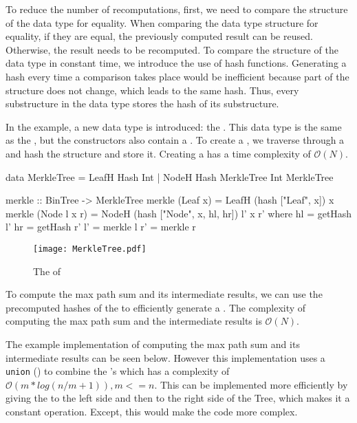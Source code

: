 To reduce the number of recomputations, first, we need to compare the structure of the data type for equality. When comparing the data type structure for equality, if they are equal, the previously computed result can be reused. Otherwise, the result needs to be recomputed. To compare the structure of the data type in constant time, we introduce the use of hash functions. Generating a hash every time a comparison takes place would be inefficient because part of the structure does not change, which leads to the same hash. Thus, every substructure in the data type stores the hash of its substructure. 

In the example, a new data type is introduced: the . This data type is the same as the , but the constructors also contain a . To create a , we traverse through a  and hash the structure and store it. Creating a  has a time complexity of $\mathcal{O}(N)$.

\begin{haskell}
data MerkleTree = LeafH Hash Int
                | NodeH Hash MerkleTree Int MerkleTree

merkle :: BinTree -> MerkleTree
merkle (Leaf x)     = LeafH (hash ["Leaf", x]) x
merkle (Node l x r) = NodeH (hash ["Node", x, hl, hr]) l' x r'
  where
    hl = getHash l'
    hr = getHash r'
    l' = merkle l
    r' = merkle r
\end{haskell}

\begin{figure}[H]
    \centering
    \texttt{[image: MerkleTree.pdf]}
    \caption{The  of }
\end{figure}

To compute the max path sum and its intermediate results, we can use the precomputed hashes of the  to efficiently generate a . The complexity of computing the max path sum and the intermediate results is $\mathcal{O}(N)$.   

The example implementation of computing the max path sum and its intermediate results can be seen below. However this implementation uses a \texttt{union} (\inlinehaskell{<>}) to combine the 's which has a complexity of $\mathcal{O}(m*log(n/m + 1)), m <= n$\cite{HaskellDataUnion}. This can be implemented more efficiently by giving the  to the left side and then to the right side of the Tree, which makes it a constant operation. Except, this would make the code more complex. 

